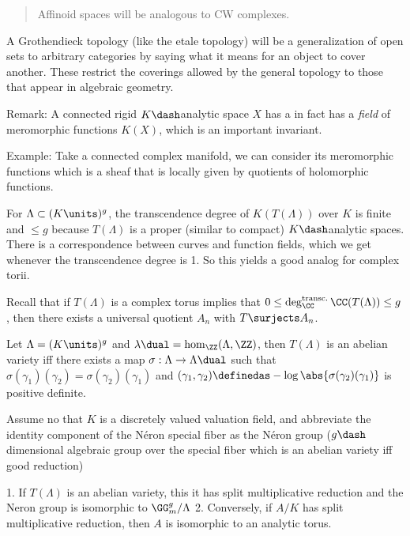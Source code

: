 \begin{quote}
Affinoid spaces will be analogous to CW complexes.
\end{quote}

A Grothendieck topology (like the etale topology) will be a
generalization of open sets to arbitrary categories by saying what it
means for an object to cover another. These restrict the coverings
allowed by the general topology to those that appear in algebraic
geometry.

Remark: A connected rigid \(K\dash\)analytic space \(X\) has a in fact
has a \emph{field} of meromorphic functions \(K(X)\), which is an
important invariant.

Example: Take a connected complex manifold, we can consider its
meromorphic functions which is a sheaf that is locally given by
quotients of holomorphic functions.

For \(\Lambda \subset (K\units)^g\), the transcendence degree of
\(K(T(\Lambda))\) over \(K\) is finite and \(\leq g\) because
\(T(\Lambda)\) is a proper (similar to compact) \(K\dash\)analytic
spaces. There is a correspondence between curves and function fields,
which we get whenever the transcendence degree is 1. So this yields a
good analog for complex torii.

Recall that if \(T(\Lambda)\) is a complex torus implies that
\(0 \leq \deg_\CC^{\text{transc.}} \CC(T(\Lambda)) \leq g\), then there
exists a universal quotient \(A_n\) with \(T\surjects A_n\).

Let \(\Lambda = (K\units)^g\) and
\(\lambda\dual = \hom_\ZZ(\Lambda, \ZZ)\), then \(T(\Lambda)\) is an
abelian variety iff there exists a map
\(\sigma: \Lambda \to \Lambda\dual\) such that
\(\sigma(\gamma_1)(\gamma_2) = \sigma(\gamma_2)(\gamma_1)\) and
\((\gamma_1, \gamma_2) \definedas - \log \abs{ \sigma(\gamma_2)(\gamma_1)}\)
is positive definite.

Assume no that \(K\) is a discretely valued valuation field, and
abbreviate the identity component of the Néron special fiber as the
Néron group (\(g\dash\)dimensional algebraic group over the special
fiber which is an abelian variety iff good reduction)

\begin{description}
\tightlist
\item[Theorem]
\hfill
1. If \(T(\Lambda)\) is an abelian variety, this it has split
multiplicative reduction and the Neron group is isomorphic to
\(\GG_m^g / \Lambda\) 2. Conversely, if \(A/K\) has split multiplicative
reduction, then \(A\) is isomorphic to an analytic torus.
\end{description}

